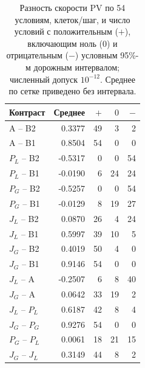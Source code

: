 \begin{table}[htbp]
\centering
\caption{Разность скорости PV по 54 условиям, клеток/шаг, и число условий с положительным ($+$), включающим ноль ($0$) и отрицательным ($-$) условным 95\%-м дорожным интервалом; численный допуск $10^{-12}$. Среднее по сетке приведено без интервала.}
\label{tab:main-contrasts}
\small
\begin{tabular}{lrrrr}
\hline
Контраст & Среднее & $+$ & $0$ & $-$ \\
\hline
A -- B2 & 0.3377 & 49 & 3 & 2 \\
A -- B1 & 0.8504 & 54 & 0 & 0 \\
$P_{L}$ -- B2 & -0.5317 & 0 & 0 & 54 \\
$P_{L}$ -- B1 & -0.0190 & 6 & 24 & 24 \\
$P_{G}$ -- B2 & -0.5257 & 0 & 0 & 54 \\
$P_{G}$ -- B1 & -0.0129 & 8 & 19 & 27 \\
$J_{L}$ -- B2 & 0.0870 & 26 & 4 & 24 \\
$J_{L}$ -- B1 & 0.5997 & 39 & 10 & 5 \\
$J_{G}$ -- B2 & 0.4019 & 50 & 4 & 0 \\
$J_{G}$ -- B1 & 0.9146 & 54 & 0 & 0 \\
$J_{L}$ -- A & -0.2507 & 6 & 8 & 40 \\
$J_{G}$ -- A & 0.0642 & 33 & 19 & 2 \\
$J_{L}$ -- $P_{L}$ & 0.6187 & 42 & 8 & 4 \\
$J_{G}$ -- $P_{G}$ & 0.9276 & 54 & 0 & 0 \\
$P_{G}$ -- $P_{L}$ & 0.0061 & 18 & 21 & 15 \\
$J_{G}$ -- $J_{L}$ & 0.3149 & 44 & 8 & 2 \\
\hline
\end{tabular}
\end{table}
